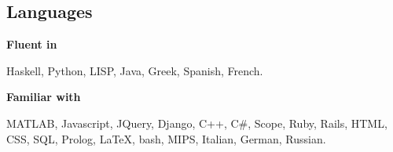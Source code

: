 \documentclass[margin,line]{resume}
\begin{document}
\begin{resume}
    \section{\mysidestyle{} Languages} 

    \textbf{Fluent in} \par\vspace{-4mm}
    {\addtolength{\leftskip}{2 mm} 
     Haskell, Python, LISP, Java, Greek, Spanish, French.
     }

    \textbf{Familiar with}\par\vspace{-4mm}
    {\addtolength{\leftskip}{2 mm} 
      MATLAB, Javascript, JQuery, Django, C++, C\#, Scope,  Ruby, Rails, HTML, CSS,  SQL, Prolog, \LaTeX, bash, MIPS, Italian, German, Russian.
    \par}



\end{resume}
\end{document}
